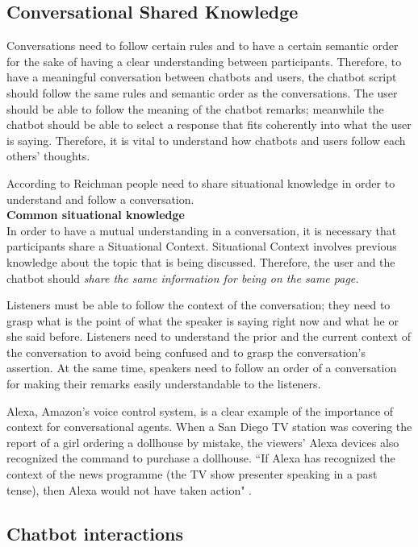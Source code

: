 \documentclass[a4paper,10pt]{article}
\begin{document}
\subsection*{Conversational Shared Knowledge}

Conversations need to follow certain rules and to have a certain semantic order for the sake of having a clear understanding between participants. Therefore, to have a meaningful conversation between chatbots and users, the chatbot script should follow the same rules and semantic order as the conversations. The user should be able to follow the meaning of the chatbot remarks; meanwhile the chatbot should be able to select a response that fits coherently into what the user is saying. Therefore, it is vital to understand how chatbots and users follow each others' thoughts.

According to Reichman \cite{reichman1985getting} people need to share situational knowledge in order to understand and follow a conversation.\\[0\baselineskip]

\textbf{Common situational knowledge}\\[0\baselineskip]
In order to have a mutual understanding in a conversation, it is necessary that participants share a Situational Context. Situational Context involves previous knowledge about the topic that is being discussed.  Therefore, the user and the chatbot should \textit{share the same information for being on the same page.} 

Listeners must be able to follow the context of the conversation; they need to grasp what is the point of what the speaker is saying right now and what he or she said before. Listeners need to understand the prior and the current context of the conversation to avoid being confused and to grasp the conversation's assertion. At the same time, speakers need to follow an order of a conversation for making their remarks easily understandable to the listeners. 

Alexa, Amazon's voice control system, is a clear example of the importance of context for conversational agents. When  a San Diego TV station was covering the report of a girl ordering a dollhouse by mistake, the viewers' Alexa devices also recognized the command to purchase a dollhouse. ``If Alexa has recognized the context of the news programme (the TV show presenter speaking in a past tense), then Alexa would not have taken action" \cite{WhatwecanlearnfromAlexasmistakes}.

\subsection*{Chatbot interactions}
\end{document}
